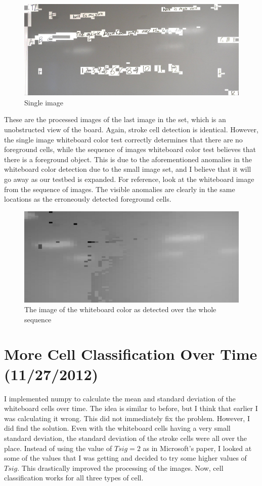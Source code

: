 \documentclass[]{article}
\begin{document}
\begin{figure}[H]
\centering
\includegraphics[scale=0.25]{images/emptyboard_single}
\caption{Single image}
\end{figure}

These are the processed images of the last image in the set, which is an unobstructed view of the board.  Again, stroke cell detection is identical.  However, the single image whiteboard color test correctly determines that there are no foreground cells, while the sequence of images whiteboard color test believes that there is a foreground object.  This is due to the aforementioned anomalies in the whiteboard color detection due to the small image set, and I believe that it will go away as our testbed is expanded.  For reference, look at the whiteboard image from the sequence of images.  The visible anomalies are clearly in the same locations as the erroneously detected foreground cells.

\begin{figure}[H]
\centering
\includegraphics[scale=0.25]{images/background_overtime}
\caption{The image of the whiteboard color as detected over the whole sequence}
\end{figure}	
	\section{More Cell Classification Over Time (11/27/2012)}
		I implemented numpy to calculate the mean and standard deviation of the whiteboard cells over time.  The idea is similar to before, but I think that earlier I was calculating it wrong.  This did not immediately fix the problem.  However, I did find the solution.  Even with the whiteboard cells having a very small standard deviation, the standard deviation of the stroke cells were all over the place.  Instead of using the value of $Tsig = 2$ as in Microsoft's paper, I looked at some of the values that I was getting and decided to try some higher values of $Tsig$.    This drastically improved the processing of the images.  Now, cell classification works for all three types of cell.  \\
		
\end{document}

